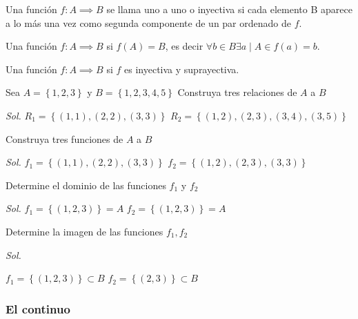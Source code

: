 \begin{definition}
	Una función $f:A\implies B$ se llama uno a uno o inyectiva si cada elemento B aparece a lo más una vez como segunda componente de un par ordenado de $f$.
\end{definition}

\begin{definition}
	Una función $f:A\implies B$ si $f(A)=B$, es decir $\forall b \in B \exists a \mid A \in f(a)=b$.
\end{definition}

\begin{definition}
	Una función $f:A\implies B$ si $f$ es inyectiva y suprayectiva.
\end{definition}

\begin{example}
	Sea $A= \left\{ 1,2,3 \right\} $ y $B= \left\{ 1,2,3,4,5 \right\}$
	Construya tres relaciones de $A$ a $B$

	\textit{ Sol. }
	$R_{1}= \left\{ \left(1,1\right),\left(2,2\right),\left(3,3\right)  \right\} $
	$R_{2}= \left\{ \left(1,2\right),\left(2,3\right),\left(3,4\right),\left(3,5\right)  \right\} $

	Construya tres funciones de $A$ a $B$

	\textit{ Sol. }
	$f_{1}= \left\{ \left(1,1\right), \left(2,2\right), \left(3,3\right) \right\}$
	$f_{2}= \left\{ \left(1,2\right),\left(2,3\right), \left(3,3\right) \right\}$
\end{example}

Determine el dominio de las funciones $f_{1}$ y $f_{2}$

\textit{ Sol. }
$f_{1}= \left\{ \left(1,2,3\right) \right\}=A$
$f_{2}= \left\{ \left(1,2,3\right)\right\}=A$

Determine la imagen de las funciones  $f_{1}, f_{2}$

\textit{ Sol. }

$f_{1}= \left\{ \left(1,2,3\right) \right\}\subset B$
$f_{2}= \left\{ \left(2,3\right)\right\}\subset B$

\subsubsection{El continuo}

